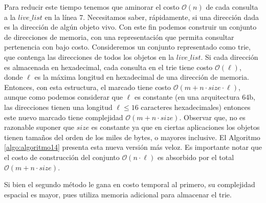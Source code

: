 Para reducir este tiempo tenemos que aminorar el costo $\mathcal{O}(n)$ de cada consulta a la $live\_list$ en la línea 7. Necesitamos saber, rápidamente, si una dirección dada es la dirección de algún objeto vivo. Con este fin podemos construir un conjunto de direcciones de memoria, con una representación que permita consultar pertenencia con bajo costo. Consideremos un conjunto representado como trie, que contenga las direcciones de todos los objetos en la $live\_list$. Si cada dirección es almacenada en hexadecimal, cada consulta en el trie tiene costo $\mathcal{O}(\ell)$, donde $\ell$ es la máxima longitud en hexadecimal de una dirección de memoria. Entonces, con esta estructura, el marcado tiene costo $\mathcal{O}(m + n \cdot size \cdot \ell)$, aunque como podemos considerar que $\ell$ es constante (en una arquitectura 64b, las direcciones tienen una longitud $\ell \leq 16$ caracteres hexadecimales) entonces este nuevo marcado tiene complejidad $\mathcal{O}(m + n \cdot size)$. Observar que, no es razonable suponer que $size$ es constante ya que en ciertas aplicaciones los objetos tienen tamaños del orden de los miles de bytes, o mayores inclusive. El Algoritmo \ref{algo:algoritmo14} presenta esta nueva versión más veloz. Es importante notar que el costo de construcción del conjunto  $\mathcal{O}(n \cdot \ell)$ es absorbido por el total $\mathcal{O}(m + n \cdot size)$.

Si bien el segundo método le gana en costo temporal al primero, su complejidad espacial es mayor, pues utiliza memoria adicional para almacenar el trie.

\begin{algorithm}
	\dontprintsemicolon
	\Input{-}
	\Output{-}
 	\BlankLine
\caption{$\textsc{Mark-Sweep}$}
\label{algo:algoritmo13}
\end{algorithm}

\begin{algorithm}
	\dontprintsemicolon
	\Output{-}
 	\BlankLine
\caption{$\textsc{Mark}$}
\label{algo:algoritmo14}
\end{algorithm}


